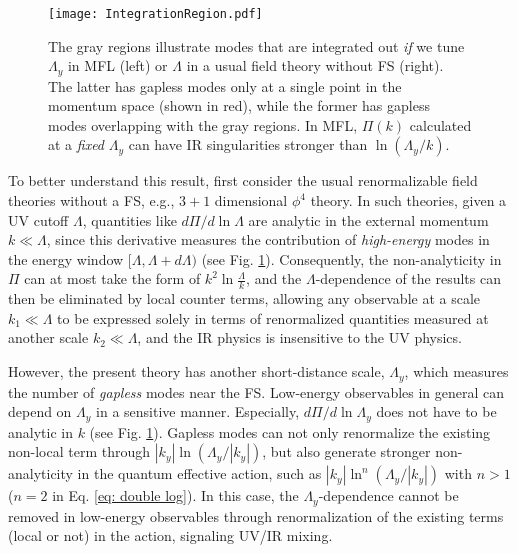 \documentclass[prl,amsmath,amssymb, notitlepage, twocolumn,
nofootinbib,
superscriptaddress,
longbibliography
]{revtex4-1}
\newcommand{\eg}{{e.g., }}
\begin{document}
\begin{figure}[h]
     \centering
     \texttt{[image: IntegrationRegion.pdf]}
         \caption{
The gray regions illustrate modes that are integrated out {\it if} we tune $\Lambda_y$ in MFL (left) or $\Lambda$ in a usual field theory without FS (right). The latter has gapless modes only at a single point in the momentum space (shown in red), while the former has gapless modes overlapping with the gray regions. 
In MFL, $\Pi(k)$ calculated at a {\it fixed} $\Lambda_y$ can have
IR singularities
stronger 
than $\ln(\Lambda_y/k)$.
}
         \label{fig: Integration Region}
\end{figure}

To better understand this result, first consider the usual renormalizable field theories without a FS, \eg $3+1$ dimensional $\phi^4$ theory.
In such theories, given a UV cutoff $\Lambda$, quantities like
$d\Pi/d\ln\Lambda$ 
are analytic in the external momentum $k\ll\Lambda$, since this derivative measures the contribution of {\it high-energy}
modes in the energy window $[\Lambda, \Lambda+d\Lambda)$ (see Fig. \ref{fig: Integration Region}). 
Consequently, the non-analyticity in $\Pi$ can at most take the form of $k^2 \ln\frac{\Lambda}{k}$, and the $\Lambda$-dependence of the results can then be eliminated by local counter terms, allowing any observable at a scale $k_1 \ll\Lambda$ to be expressed solely in terms of renormalized quantities measured at another scale $k_2 \ll\Lambda$, and the IR physics is insensitive to the UV physics.

However, the present theory has another short-distance scale, $\Lambda_y$, which measures the number of {\it gapless} modes near the FS.
Low-energy observables in general can depend on $\Lambda_y$ in a sensitive manner. Especially, $d\Pi/d\ln\Lambda_y$ does not have to be analytic in $k$
(see Fig. \ref{fig: Integration Region}). Gapless modes can not only renormalize the existing non-local term through
$|k_y| \ln(\Lambda_y/|k_y|)$,
but also generate stronger non-analyticity
in the quantum effective action, such as 
$|k_y| \ln^n(\Lambda_y/|k_y|)$ with $n>1$ ($n=2$ in Eq. \eqref{eq: double log}).
In this case, the $\Lambda_y$-dependence cannot be removed in low-energy observables through renormalization of the existing terms (local or not) in the action, signaling UV/IR mixing.
\end{document}
